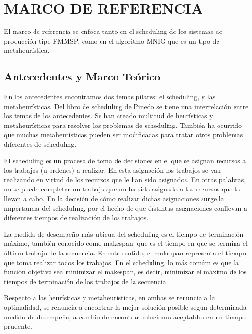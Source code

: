 \documentclass{article}
\begin{document}
\section{MARCO DE REFERENCIA}

El marco de referencia se enfoca tanto en el scheduling de los sistemas de
producción tipo FMMSP, como en el algoritmo MNIG que es un tipo de
metaheurística.

\subsection{Antecedentes y Marco Teórico}

En los antecedentes encontramos dos temas pilares: el scheduling, y las
metaheurísticas. Del libro de scheduling de Pinedo \autocite{schedPinedo} se
tiene una interrelación entre los temas de los antecedentes. Se han creado
multitud de heurísticas y metaheurísticas para resolver los problemas de
scheduling. También ha ocurrido que muchas metaheurísticas pueden ser
modificadas para tratar otros problemas diferentes de scheduling.

\vspace{\baselineskip}
El scheduling es un proceso de toma de decisiones en el que se asignan
recursos a los trabajos (u ordenes) a realizar. En esta asignación los
trabajos se van realizando en virtud de los recursos que le han sido
asignados. En otras palabras, no se puede completar un trabajo que no ha
sido asignado a los recursos que lo llevan a cabo. En la decisión de cómo
realizar dichas asignaciones surge la importancia del scheduling, por el
hecho de que distintas asignaciones conllevan a diferentes tiempos de
realización de los trabajos. \autocite{schedPinedo}

\vspace{\baselineskip}
La medida de desempeño más ubicua del scheduling es el tiempo de terminación
máximo, también conocido como makespan, que es el tiempo en que se termina
el último trabajo de la secuencia. En este sentido, el makespan representa
el tiempo que toma realizar todos los trabajos. En el scheduling, lo más
comúm es que la función objetivo sea minimizar el makespan, es decir,
minimizar el máximo de los tiempos de terminación de los trabajos de la
secuencia \autocite{schedPinedo}

\vspace{\baselineskip}
Respecto a las heurísticas y metaheurísticas, en ambas se renuncia a la
optimalidad, se renuncia a encontrar la mejor solución posible según
determinada medida de desempeño, a cambio de encontrar soluciones aceptables
en un tiempo prudente. \autocite{metaTalbi}
\end{document}
